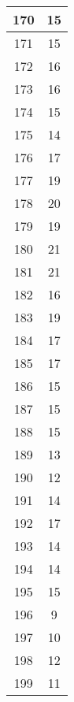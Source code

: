 \documentclass[letterpaper, 12pt]{article}
\begin{document}
\begin{longtable}{|c|c|}
\hline
170 & 15 \\
\hline
171 & 15 \\
\hline
172 & 16 \\
\hline
173 & 16 \\
\hline
174 & 15 \\
\hline
175 & 14 \\
\hline
176 & 17 \\
\hline
177 & 19 \\
\hline
178 & 20 \\
\hline
179 & 19 \\
\hline
180 & 21 \\
\hline
181 & 21 \\
\hline
182 & 16 \\
\hline
183 & 19 \\
\hline
184 & 17 \\
\hline
185 & 17 \\
\hline
186 & 15 \\
\hline
187 & 15 \\
\hline
188 & 15 \\
\hline
189 & 13 \\
\hline
190 & 12 \\
\hline
191 & 14 \\
\hline
192 & 17 \\
\hline
193 & 14 \\
\hline
194 & 14 \\
\hline
195 & 15 \\
\hline
196 & 9 \\
\hline
197 & 10 \\
\hline
198 & 12 \\
\hline
199 & 11 \\
\hline
\end{longtable}
\end{document}
